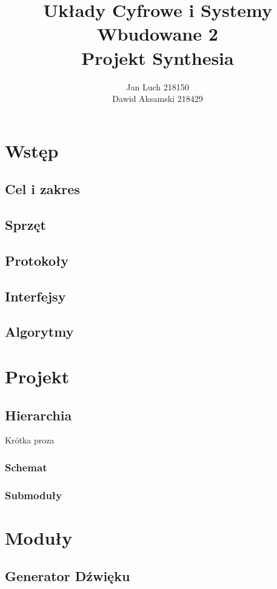 \documentclass[a4paper]{report}
\title{\huge Układy Cyfrowe i Systemy Wbudowane 2\\Projekt Synthesia}
\date{} %
\author{Jan Luch\hspace{42pt} 218150  \\Dawid Aksamski\hspace{5pt} 218429}
\begin{document}
\frenchspacing
{}
\maketitle
\newpage

\tableofcontents
\newpage


\chapter{Wstęp}
	\section{Cel i zakres}
	\section{Sprzęt}
	\section{Protokoły}
	\section{Interfejsy}
	\section{Algorytmy}

\chapter{Projekt}
	\section{Hierarchia}
	Krótka proza
		\subsection{Schemat}
		\subsection{Submoduły}
\chapter{Moduły}
	\section{Generator Dźwięku}
\end{document}
